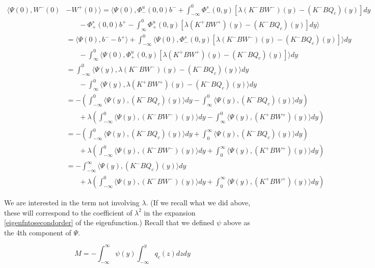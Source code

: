 \documentclass[12pt]{article}
\begin{document}
\begin{align*}
\langle \Psi(0), W^-(0) &- W^+(0) \rangle = \langle \Psi(0), \Phi^u_-(0, 0)b^- + \int_{-\infty}^0 \Phi^s_-(0, y)[\lambda (K^- B W^-)(y) - (K^- B Q_c)(y)] dy  \\
&\:\:\:\:\:\:\:\: - \Phi^s_+(0, 0)b^+ - \int_\infty^0 \Phi^u_+(0, y)[\lambda (K^+ B W^+)(y) - (K^- B Q_c)(y) ] dy \rangle \\
&= \langle \Psi(0), b^- - b^+\rangle + \int_{-\infty}^0 \langle \Psi(0), \Phi^s_-(0, y)[\lambda (K^- B W^-)(y) - (K^- B Q_c)(y) ] \rangle dy  \\
&\:\:\:\:\:\:\:\:- \int_\infty^0 \langle \Psi(0), \Phi^u_+(0, y)[\lambda (K^+ B W^+)(y) - (K^- B Q_c)(y) ] \rangle dy  \\
&= \int_{-\infty}^0 \langle \Psi(y), \lambda (K^- B W^-)(y) - (K^- B Q_c)(y) \rangle dy \\
&\:\:\:\:\:\:\:\:- \int_\infty^0 \langle \Psi(y), \lambda (K^+ B W^+)(y) - (K^- B Q_c)(y) \rangle dy \\
&= -\left( \int_{-\infty}^0 \langle \Psi(y), (K^- B Q_c)(y) \rangle dy - \int_{\infty}^0 \langle \Psi(y), (K^- B Q_c)(y) \rangle dy \right) \\
&\:\:\:\:\:\:\:\:+ \lambda\left( \int_{-\infty}^0 \langle \Psi(y), (K^- B W^-)(y) \rangle dy - \int_\infty^0 \langle \Psi(y), (K^+ B W^+)(y) \rangle dy \right) \\
&= -\left( \int_{-\infty}^0 \langle \Psi(y), (K^- B Q_c)(y) \rangle dy + \int_0^{\infty} \langle \Psi(y), (K^- B Q_c)(y) \rangle dy  \right) \\
&\:\:\:\:\:\:\:\:+ \lambda\left( \int_{-\infty}^0 \langle \Psi(y), (K^- B W^-)(y) \rangle dy + \int_0^\infty \langle \Psi(y), (K^+ B W^+)(y) \rangle dy \right) \\
&= -\int_{-\infty}^\infty \langle \Psi(y), (K^- B Q_c)(y) \rangle dy \\
&\:\:\:\:\:\:\:\:+ \lambda\left( \int_{-\infty}^0 \langle \Psi(y), (K^- B W^-)(y) \rangle dy + \int_0^\infty \langle \Psi(y), (K^+ B W^+)(y) \rangle dy \right) 
\end{align*}

We are interested in the term not involving $\lambda$. (If we recall what we did above, these will correspond to the coefficient of $\lambda^2$ in the expansion \eqref{eigenfntosecondorder} of the eigenfunction.) Recall that we defined $\psi$ above as the 4th component of $\Psi$. 

\begin{equation}
M = -\int_{-\infty}^\infty \psi(y) \int_{-\infty}^y q_c(z) dz dy
\end{equation}
\end{document}
